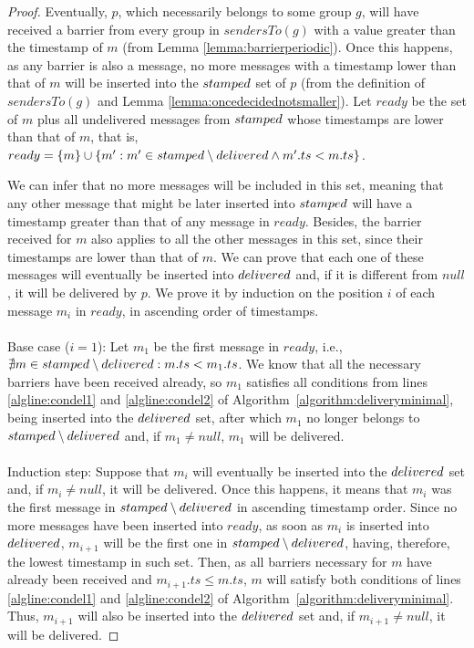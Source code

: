 \documentclass[times, 10pt]{article}
\begin{document}
\begin{proof}
Eventually, $p$, which necessarily belongs to some group $g$, will have received a barrier from every group in $sendersTo(g)$ with a value greater than the timestamp of $m$ (from Lemma \ref{lemma:barrierperiodic}). Once this happens, as any barrier is also a message, no more messages with a timestamp lower than that of $m$ will be inserted into the $stamped$ set of $p$ (from the definition of $sendersTo(g)$ and Lemma \ref{lemma:oncedecidednotsmaller}). Let $ready$ be the set of $m$ plus all undelivered messages from $stamped$ whose timestamps are lower than that of $m$, that is, $ready = \{m\} \cup \{m' : m' \in stamped \setminus delivered \wedge m'.ts < m.ts\}$.

We can infer that no more messages will be included in this set, meaning that any other message that might be later inserted into $stamped$ will have a timestamp greater than that of any message in $ready$. Besides, the barrier received for $m$ also applies to all the other messages in this set, since their timestamps are lower than that of $m$. We can prove that each one of these messages will eventually be inserted into $delivered$ and, if it is different from $null$, it will be delivered by $p$. We prove it by induction on the position $i$ of each message $m_i$ in $ready$, in ascending order of timestamps.\\
\\
\noindent Base case ($i=1$): Let $m_1$ be the first message in $ready$, i.e., \mbox{$\nexists m \in stamped \setminus delivered : m.ts < m_1.ts$}. We know that all the necessary barriers have been received already, so $m_1$ satisfies all conditions from lines \ref{algline:condel1} and \ref{algline:condel2} of \mbox{Algorithm \ref{algorithm:deliveryminimal}}, being inserted into the $delivered$ set, after which $m_1$ no longer belongs to $stamped \setminus delivered$ and, if $m_1 \neq null$, $m_1$ will be delivered.\\
\\
\noindent Induction step: Suppose that $m_{i}$ will eventually be inserted into the $delivered$ set and, if $m_i \neq null$, it will be delivered. Once this happens, it means that $m_{i}$ was the first message in $stamped \setminus delivered$ in ascending timestamp order. Since no more messages have been inserted into $ready$, as soon as $m_{i}$ is inserted into $delivered$, $m_{i+1}$ will be the first one in $stamped \setminus delivered$, having, therefore, the lowest timestamp in such set. Then, as all barriers necessary for $m$ have already been received and $m_{i+1}.ts \leq m.ts$, $m$ will satisfy both conditions of lines \ref{algline:condel1} and \ref{algline:condel2} of \mbox{Algorithm \ref{algorithm:deliveryminimal}}. Thus, $m_{i+1}$ will also be inserted into the $delivered$ set and, if $m_{i+1} \neq null$, it will be delivered.
\end{proof}
\end{document}
